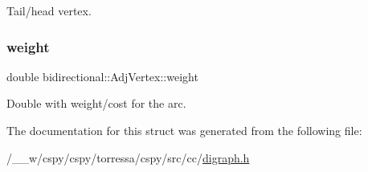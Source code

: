 Tail/head vertex. 

\mbox{\label{structbidirectional_1_1AdjVertex_a416d2c737409cf4ed7d7494508f3a7de}} 
\subsubsection{\texorpdfstring{weight}{weight}}
{\footnotesize\ttfamily double bidirectional\+::\+Adj\+Vertex\+::weight}



Double with weight/cost for the arc. 



The documentation for this struct was generated from the following file\+:\begin{DoxyCompactItemize}
\item 
/\+\_\+\+\_\+w/cspy/cspy/torressa/cspy/src/cc/\hyperlink{digraph_8h}{digraph.\+h}\end{DoxyCompactItemize}
